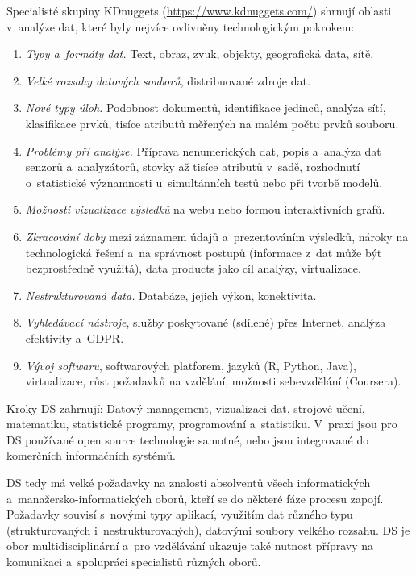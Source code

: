 Specialisté skupiny KDnuggets (\url{https://www.kdnuggets.com/}) shrnují oblasti v~analýze dat, které byly nejvíce ovlivněny technologickým pokrokem: 
\begin{enumerate}
\itemsep=-1pt
\item \textit{Typy a~formáty dat.} Text, obraz, zvuk, objekty, geografická data, sítě.
\item \textit{Velké rozsahy datových souborů}, distribuované zdroje dat.
\item \textit{Nové typy úloh.} Podobnost dokumentů, identifikace jedinců, analýza sítí, klasifikace prvků, tisíce atributů měřených na malém počtu prvků souboru.
\item \textit{Problémy při analýze.} Příprava nenumerických dat, popis a~analýza dat senzorů a~analyzátorů, stovky až tisíce atributů v~sadě, rozhodnutí o~statistické významnosti u~simultánních testů nebo při tvorbě modelů.
\item \textit{Možnosti vizualizace výsledků} na webu nebo formou interaktivních grafů.
\item \textit{Zkracování doby} mezi záznamem údajů a~prezentováním výsledků, nároky na technologická řešení a~na správnost postupů (informace z~dat může být bezprostředně využitá), data products jako cíl analýzy, virtualizace.
\item \textit{Nestrukturovaná data.} Databáze, jejich výkon, konektivita.
\item \textit{Vyhledávací nástroje}, služby poskytované (sdílené) přes Internet, analýza efektivity a~GDPR.
\item \textit{Vývoj softwaru}, softwarových platforem, jazyků (R, Python, Java), virtualizace, růst požadavků na vzdělání, možnosti sebevzdělání (Coursera).
\end{enumerate}

Kroky DS zahrnují: Datový management, vizualizaci dat, strojové učení, matematiku, statistické programy, programování a~statistiku. V~praxi jsou pro DS používané open source technologie samotné, nebo jsou integrované do komerčních informačních systémů.  

DS tedy má velké požadavky na znalosti absolventů všech informatických a~manažersko-informatických oborů, kteří se do některé fáze procesu zapojí. Požadavky souvisí s~novými typy aplikací, využitím dat různého typu (strukturovaných i~nestrukturovaných), datovými soubory velkého rozsahu. DS je obor multidisciplinární a~pro vzdělávání ukazuje také nutnost přípravy na komunikaci a~spolupráci specialistů různých oborů. 

